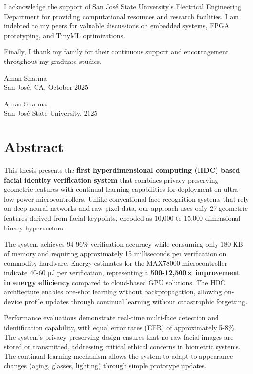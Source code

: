 \documentclass[a4paper,12pt]{article}
\begin{document}
I acknowledge the support of San José State University's Electrical Engineering Department for providing computational resources and research facilities. I am indebted to my peers for valuable discussions on embedded systems, FPGA prototyping, and TinyML optimizations. 

Finally, I thank my family for their continuous support and encouragement throughout my graduate studies.

Aman Sharma\\
San José, CA, October 2025

\newpage

\vspace*{-0.7cm}
\underline{Aman Sharma}\\
San José State University, 2025\\

\vspace*{-0.7cm}\section*{Abstract}

This thesis presents the \textbf{first hyperdimensional computing (HDC) based facial identity verification system} that combines privacy-preserving geometric features with continual learning capabilities for deployment on ultra-low-power microcontrollers. Unlike conventional face recognition systems that rely on deep neural networks and raw pixel data, our approach uses only 27 geometric features derived from facial keypoints, encoded as 10,000-to-15,000 dimensional binary hypervectors.

The system achieves 94-96\% verification accuracy while consuming only 180 KB of memory and requiring approximately 15 milliseconds per verification on commodity hardware. Energy estimates for the MAX78000 microcontroller indicate 40-60 μJ per verification, representing a \textbf{500-12,500× improvement in energy efficiency} compared to cloud-based GPU solutions. The HDC architecture enables one-shot learning without backpropagation, allowing on-device profile updates through continual learning without catastrophic forgetting.

Performance evaluations demonstrate real-time multi-face detection and identification capability, with equal error rates (EER) of approximately 5-8\%. The system's privacy-preserving design ensures that no raw facial images are stored or transmitted, addressing critical ethical concerns in biometric systems. The continual learning mechanism allows the system to adapt to appearance changes (aging, glasses, lighting) through simple prototype updates.
\end{document}
